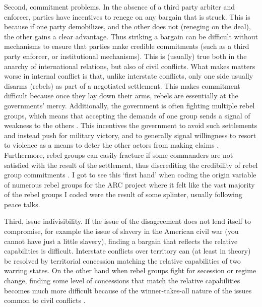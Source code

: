 Second, commitment problems. In the absence of a third party arbiter and
enforcer, parties have incentives to renege on any bargain that is struck. This
is because if one party demobilizes, and the other does not (reneging on the
deal), the other gains a clear advantage. Thus striking a bargain can be
difficult without mechanisms to ensure that parties make credible commitments
(such as a third party enforcer, or institutional mechanisms). This is (usually)
true both in the anarchy of international relations, but also of civil
conflicts. What makes matters worse in internal conflict is that, unlike
interstate conflicts, only one side usually disarms (rebels) as part of a
negotiated settlement. This makes commitment difficult because once they lay
down their arms, rebels are essentially at the governments' mercy. Additionally,
the government is often fighting multiple rebel groups, which means that
accepting the demands of one group sends a signal of weakness to the others
\citep{Cunningham2006}. This incentives the government to avoid such settlements
and instead push for military victory, and to generally signal willingness to
resort to violence as a means to deter the other actors from making claims
\citep{Walter2006, Walter2009}. Furthermore, rebel groups can easily fracture if
some commanders are not satisfied with the result of the settlement, thus
discrediting the credibility of rebel group commitments \citep{Cunningham2013c}.
I got to see this `first hand' when coding the origin variable of numerous rebel
groups for the ARC project where it felt like the vast majority of the rebel
groups I coded were the result of some splinter, usually following peace talks.

Third, issue indivisibility. If the issue of the disagreement does not lend
itself to compromise, for example the issue of slavery in the American civil war
(you cannot have just a little slavery), finding a bargain that reflects the
relative capabilities is difficult. Interstate conflicts over territory can (at
least in theory) be resolved by territorial concession matching the relative
capabilities of two warring states. On the other hand when rebel groups fight
for secession or regime change, finding some level of concessions that match the
relative capabilities becomes much more difficult because of the
winner-takes-all nature of the issues common to civil conflicts \citep{Toft2005,
Duffy_Toft_2002}. 


